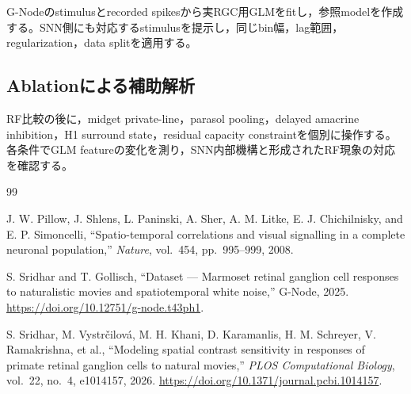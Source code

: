 \documentclass[uplatex,dvipdfmx,a4paper,10pt]{jsarticle}
\begin{document}
G-Nodeのstimulusとrecorded spikesから実RGC用GLMをfitし，参照modelを作成する。SNN側にも対応するstimulusを提示し，同じbin幅，lag範囲，regularization，data splitを適用する。

\subsection{Ablationによる補助解析}
\label{subsec:ablation}

RF比較の後に，midget private-line，parasol pooling，delayed amacrine inhibition，H1 surround state，residual capacity constraintを個別に操作する。各条件でGLM featureの変化を測り，SNN内部機構と形成されたRF現象の対応を確認する。

\begin{thebibliography}{99}
\small

J. W. Pillow, J. Shlens, L. Paninski, A. Sher, A. M. Litke,
E. J. Chichilnisky, and E. P. Simoncelli,
``Spatio-temporal correlations and visual signalling in a complete
neuronal population,''
\textit{Nature}, vol.~454, pp.~995--999, 2008.

S. Sridhar and T. Gollisch,
``Dataset --- Marmoset retinal ganglion cell responses to naturalistic
movies and spatiotemporal white noise,''
G-Node, 2025.
\url{https://doi.org/10.12751/g-node.t43ph1}.

S. Sridhar, M. Vystrčilová, M. H. Khani, D. Karamanlis,
H. M. Schreyer, V. Ramakrishna, et al.,
``Modeling spatial contrast sensitivity in responses of primate retinal
ganglion cells to natural movies,''
\textit{PLOS Computational Biology}, vol.~22, no.~4, e1014157, 2026.
\url{https://doi.org/10.1371/journal.pcbi.1014157}.

\end{thebibliography}
\end{document}
